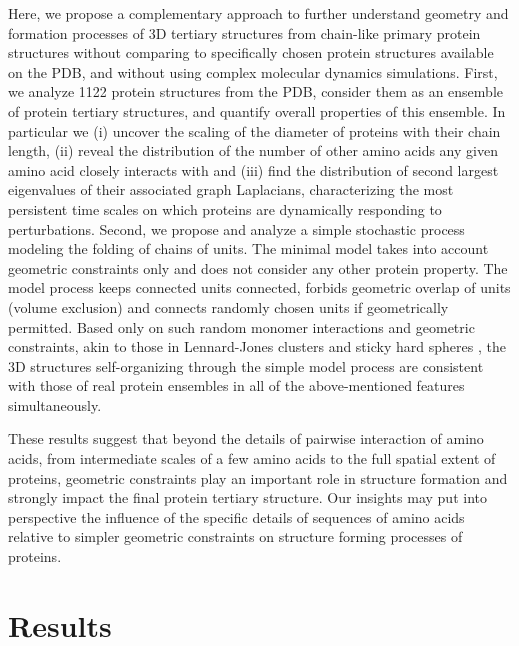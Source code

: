 \documentclass[9pt]{elife}
\begin{document}
 Here, we propose a complementary approach to further understand geometry and formation processes of 3D tertiary structures from chain-like primary protein structures without comparing to specifically chosen protein structures available on the PDB, and without using complex molecular dynamics simulations. First, we analyze 1122 protein structures from the PDB, consider them as an ensemble of protein tertiary structures, and quantify overall properties of this ensemble. In particular we (i) uncover the scaling of the diameter of proteins with their chain length, (ii) reveal the distribution of the number of other amino acids any given amino acid closely interacts with and (iii) find the distribution of second largest eigenvalues of their associated graph Laplacians, characterizing the most persistent time scales on which proteins are dynamically responding to perturbations. Second, we propose and analyze a simple stochastic process modeling the folding of chains of units. The minimal model takes into account geometric constraints only and does not consider any other protein property. The model process keeps connected units connected, forbids geometric overlap of units (volume exclusion) and connects randomly chosen units if geometrically permitted. Based only on such random monomer interactions and geometric constraints, akin to those in Lennard-Jones clusters and sticky hard spheres \cite{trombach2018sticky,uppenbrink1991packing}, the 3D structures self-organizing through the simple model process are consistent with those of real protein ensembles in all of the above-mentioned features simultaneously.
 
 These results suggest that beyond the details of pairwise interaction of amino acids, from intermediate scales of a few amino acids to the full spatial extent of proteins, geometric constraints play an important role in structure formation and strongly impact the final protein tertiary structure. Our insights may put into perspective the influence of the specific details of sequences of amino acids relative to simpler geometric constraints on structure forming processes of proteins. 

\section{Results}
\end{document}
